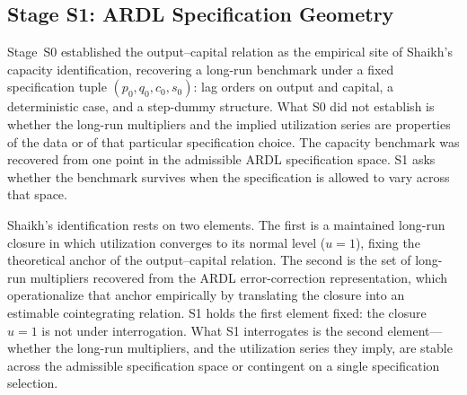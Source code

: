 \documentclass[11pt,a4paper]{article}
\begin{document}

\subsection{Stage S1: ARDL Specification Geometry}
\label{sec:S1}


Stage~S0 established the output--capital relation as the empirical site of
Shaikh's capacity identification, recovering a long-run benchmark under a
fixed specification tuple $(p_0, q_0, c_0, s_0)$: lag orders on output and
capital, a deterministic case, and a step-dummy structure. What S0 did not
establish is whether the long-run multipliers and the implied utilization
series are properties of the data or of that particular specification
choice. The capacity benchmark was recovered from one point in the
admissible ARDL specification space. S1 asks whether the benchmark survives
when the specification is allowed to vary across that space.


Shaikh's identification rests on two elements. The first is a maintained
long-run closure in which utilization converges to its normal level ($u = 1$),
fixing the theoretical anchor of the output--capital relation. The second is
the set of long-run multipliers recovered from the ARDL error-correction
representation, which operationalize that anchor empirically by translating
the closure into an estimable cointegrating relation. S1 holds the first
element fixed: the closure $u = 1$ is not under interrogation. What S1
interrogates is the second element---whether the long-run multipliers, and
the utilization series they imply, are stable across the admissible
specification space or contingent on a single specification selection.

\end{document}
